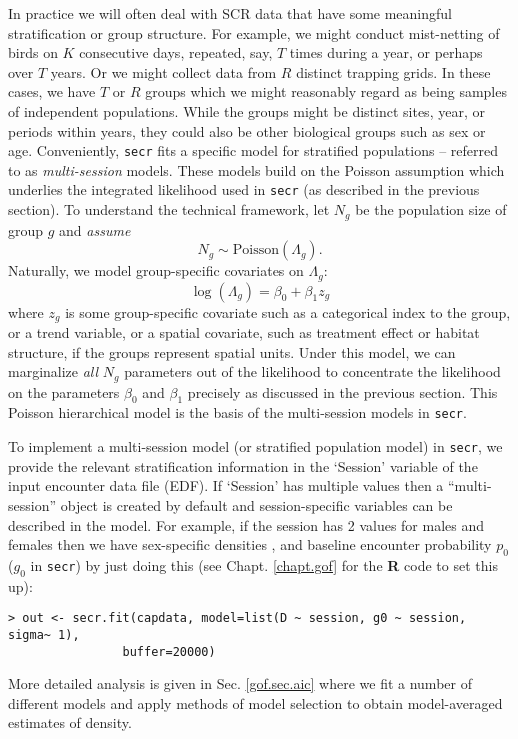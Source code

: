 In practice we will often deal with SCR data that have some meaningful
stratification or group structure.  For example, we might conduct
mist-netting of birds on $K$ consecutive days, repeated, say, $T$
times during a year, or perhaps over $T$ years. Or we might collect
data from $R$ distinct trapping grids.  In these cases, we have $T$ or
$R$ groups which we might reasonably regard as being samples of
independent populations.  While the groups might be distinct sites,
year, or periods within years, they could also be other biological
groups such as sex or age.  Conveniently, \mbox{\tt secr} fits a
specific model for stratified populations -- referred to as {\it
  multi-session} models. These models build on the Poisson assumption
which underlies the integrated likelihood used in \mbox{\tt secr} (as
described in the previous section).  To understand the technical
framework, let $N_{g}$ be the population size of group $g$ and {\it
  assume}
\[
 N_{g} \sim \mbox{Poisson}(\Lambda_{g}).
\]
Naturally, we model group-specific covariates on $\Lambda_{g}$:
\[
 \log(\Lambda_{g}) = \beta_{0} + \beta_{1} z_{g}
\]
where $z_{g}$ is some group-specific covariate such as a categorical
index to the group, or a trend variable, or a spatial covariate, such
as treatment effect or habitat structure, if the groups represent
spatial units.  Under this model, we can marginalize {\it all} $N_{g}$
parameters out of the likelihood to concentrate the likelihood on the
parameters $\beta_{0}$ and $\beta_{1}$ precisely as discussed in the
previous section. This Poisson hierarchical model is the basis of the
multi-session models in \mbox{\tt secr}.

To implement a multi-session model (or stratified population model) in
\mbox{\tt secr}, we provide the relevant stratification information in
the `Session' variable of the input encounter data file (EDF). If
`Session' has multiple values then a ``multi-session'' object is
created by default and session-specific variables can be described in
the model. For example, if the session has 2 values for males and
females then we have sex-specific densities , and baseline encounter
probability $p_{0}$ ($g_{0}$ in \mbox{\tt secr}) by just doing this
(see Chapt. \ref{chapt.gof} for the {\bf R} code to set this up):
\begin{verbatim}
> out <- secr.fit(capdata, model=list(D ~ session, g0 ~ session, sigma~ 1),
                buffer=20000)
\end{verbatim}
More detailed analysis is given in Sec. \ref{gof.sec.aic} where we fit
a number of different models and apply methods of model selection to
obtain model-averaged estimates of density.

